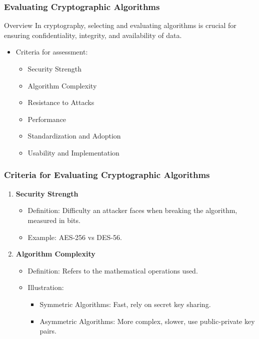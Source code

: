 \documentclass{beamer}
\begin{document}
\begin{frame}[fragile]
    \frametitle{Evaluating Cryptographic Algorithms}
    
    \begin{block}{Overview}
        In cryptography, selecting and evaluating algorithms is crucial for ensuring confidentiality, integrity, and availability of data.
    \end{block}
    
    \begin{itemize}
        \item Criteria for assessment:
        \begin{itemize}
            \item Security Strength
            \item Algorithm Complexity
            \item Resistance to Attacks
            \item Performance
            \item Standardization and Adoption
            \item Usability and Implementation
        \end{itemize}
    \end{itemize}
\end{frame}

\begin{frame}[fragile]
    \frametitle{Criteria for Evaluating Cryptographic Algorithms}
    
    \begin{enumerate}
        \item \textbf{Security Strength}
            \begin{itemize}
                \item Definition: Difficulty an attacker faces when breaking the algorithm, measured in bits.
                \item Example: AES-256 vs DES-56.
            \end{itemize}
            
        \item \textbf{Algorithm Complexity}
            \begin{itemize}
                \item Definition: Refers to the mathematical operations used.
                \item Illustration:
                    \begin{itemize}
                        \item Symmetric Algorithms: Fast, rely on secret key sharing.
                        \item Asymmetric Algorithms: More complex, slower, use public-private key pairs.
                    \end{itemize}
            \end{itemize}
    \end{enumerate}
\end{frame}
\end{document}
